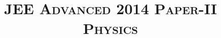\documentclass{article}
\title{\textsc{JEE Advanced 2014 Paper-II\\Physics}}
\date{}
\begin{document}
\maketitle
\begin{enumerate}
    
    
    
    
    
    
    
    
    
    
    
    
    
    
    
    
    
\end{enumerate}
\end{document}
